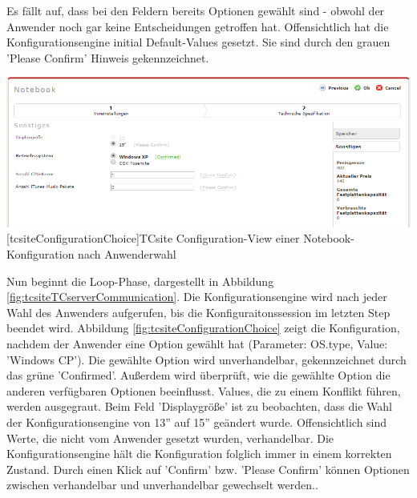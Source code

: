 \documentclass[12pt,a4paper,bibliography=totocnumbered,listof=totoc]{scrartcl}
\begin{document}
Es fällt auf, dass bei den Feldern bereits Optionen gewählt sind - obwohl der Anwender noch gar keine Entscheidungen getroffen hat. Offensichtlich hat die Konfigurationsengine initial Default-Values gesetzt. Sie sind durch den grauen 'Please Confirm' Hinweis gekennzeichnet.

\vspace{1em}
\begin{minipage}{\linewidth}
	\centering
	\includegraphics[width=0.8\linewidth]{Abbildungen/tcsiteConfigurationChoice.PNG}
	[tcsiteConfigurationChoice]{TCsite Configuration-View einer Notebook-Konfiguration nach Anwenderwahl}
	\label{fig:tcsiteConfigurationChoice}
\end{minipage}
\vspace{1em}

Nun beginnt die Loop-Phase, dargestellt in Abbildung \ref{fig:tcsiteTCserverCommunication}. Die Konfigurationsengine wird nach jeder Wahl des Anwenders aufgerufen, bis die Konfiguraitonssession im letzten Step beendet wird. Abbildung \ref{fig:tcsiteConfigurationChoice} zeigt die Konfiguration, nachdem der Anwender eine Option gewählt hat (Parameter: OS.type, Value: 'Windows CP'). Die gewählte Option wird unverhandelbar, gekennzeichnet durch das grüne 'Confirmed'. Außerdem wird überprüft, wie die gewählte Option die anderen verfügbaren Optionen beeinflusst. Values, die zu einem Konflikt führen, werden ausgegraut. Beim Feld 'Displaygröße' ist zu beobachten, dass die Wahl der Konfigurationsengine von 13'' auf 15'' geändert wurde. Offensichtlich sind Werte, die nicht vom Anwender gesetzt wurden, verhandelbar. Die Konfigurationsengine hält die Konfiguration folglich immer in einem korrekten Zustand. Durch einen Klick auf 'Confirm' bzw. 'Please Confirm'  können Optionen zwischen verhandelbar und unverhandelbar gewechselt werden..
\end{document}
